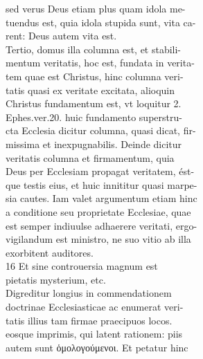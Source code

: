 \documentclass{article}
\begin{document}
\begin{pages}
                sed verus Deus etiam plus quam idola me- \\
                tuendus est, quia idola stupida sunt, vita ca- \\
                rent: Deus autem vita est. \\
                Tertio, domus illa columna est, et stabili- \\
                mentum veritatis, hoc est, fundata in verita- \\
                tem quae est Christus, hinc columna veri- \\
                tatis quasi ex veritate excitata, alioquin \\
                Christus fundamentum est, vt loquitur 2. \\
                Ephes.ver.20. huic fundamento superstru- \\
                cta Ecclesia dicitur columna, quasi dicat, fir- \\
                missima et inexpugnabilis. Deinde dicitur \\
                veritatis columna et firmamentum, quia \\
                Deus per Ecclesiam propagat veritatem, ést- \\
                que testis eius, et huic innititur quasi marpe- \\
                sia cautes. Iam valet argumentum etiam hinc \\
                a conditione seu proprietate Ecclesiae, quae \\
                est semper indiuulse adhaerere veritati, ergo- \\
                vigilandum est ministro, ne suo vitio ab illa \\
                exorbitent auditores. \\
                16 Et sine controuersia magnum est \\
                pietatis mysterium, etc. \\
                Digreditur longius in commendationem \\
                doctrinae Ecclesiasticae ac enumerat veri- \\
                tatis illius tam firmae praecipuos locos. \\
                eosque imprimis, qui latent rationem: piis \\
                autem sunt ὁμολογούμενοι. Et petatur hinc \\

\end{pages}
\end{document}
